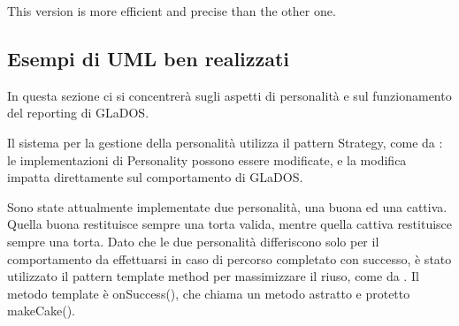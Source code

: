 \documentclass[a4paper,12pt]{report}
\begin{document}
This version is more efficient and precise than the other one.




\subsection*{Esempi di UML ben realizzati}

In questa sezione ci si concentrerà sugli aspetti di personalità e sul funzionamento del reporting di GLaDOS.

Il sistema per la gestione della personalità utilizza il pattern Strategy, come da : le implementazioni di Personality possono essere modificate, e la modifica impatta direttamente sul comportamento di GLaDOS.


Sono state attualmente implementate due personalità, una buona ed una cattiva.
Quella buona restituisce sempre una torta valida, mentre quella cattiva restituisce sempre una torta.
Dato che le due personalità differiscono solo per il comportamento da effettuarsi in caso di percorso completato con successo, è stato utilizzato il pattern template method per massimizzare il riuso, come da .
Il metodo template è onSuccess(), che chiama un metodo astratto e protetto makeCake().
\end{document}

